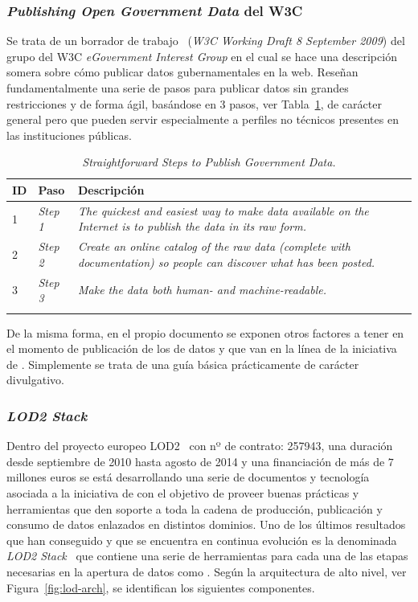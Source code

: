 \subsubsection{\textit{Publishing Open Government Data} del W3C}
Se trata de un borrador de trabajo~\cite{publishing-ogd} (\textit{W3C Working Draft 8 September 2009}) del grupo del \gls{W3C} \textit{\gls{eGovernment} Interest Group} en el cual
se hace una descripción somera sobre cómo publicar datos gubernamentales en la web. Reseñan fundamentalmente una serie de pasos 
para publicar datos sin grandes restricciones y de forma ágil, basándose en 3 pasos,
 ver Tabla~\ref{table:publish-ogd}, de carácter general pero que pueden servir especialmente a perfiles
no técnicos presentes en las instituciones públicas.

\begin{longtable}[c]{|l|p{7cm}|p{8cm}|} 
\hline
  \textbf{ID} & \textbf{Paso} & \textbf{Descripción} \\\hline
\endhead
  1 &  \textit{Step 1} & \textit{The quickest and easiest way to make data available on the Internet is to publish the data in its raw form.}\\ \hline
  2 &  \textit{Step 2} & \textit{Create an online catalog of the raw data (complete with documentation) so people can discover what has been posted.} \\ \hline
  3 &  \textit{Step 3} &   \textit{Make the data both human- and machine-readable.} \\ \hline
\hline
\caption{\textit{Straightforward Steps to Publish Government Data.}}\label{table:publish-ogd}\\    
\end{longtable}

De la misma forma, en el propio documento se exponen otros factores a tener en el momento
de publicación de los de datos y que van en la línea de la iniciativa de \linkeddata. Simplemente se trata
de una guía básica prácticamente de carácter divulgativo.

\subsubsection{\textit{LOD2 Stack}}\label{lod2-project}
Dentro del proyecto europeo LOD2~\cite{lod2-project} con nº de contrato: 257943, una duración desde septiembre de 2010
hasta agosto de 2014 y una financiación de más de $7$ millones euros se está desarrollando
una serie de documentos y tecnología asociada a la iniciativa de \lod con el objetivo de proveer
buenas prácticas y herramientas que den soporte a toda la cadena de producción, publicación y consumo
de datos enlazados en distintos dominios. Uno de los últimos resultados que han conseguido y que
se encuentra en continua evolución es la denominada \textit{LOD2 Stack}~\cite{lod2-stack} que contiene una
serie de herramientas para cada una de las etapas necesarias en la apertura de datos como \linkeddata.
Según la arquitectura de alto nivel, ver Figura~\ref{fig:lod-arch}, se identifican los siguientes componentes.

